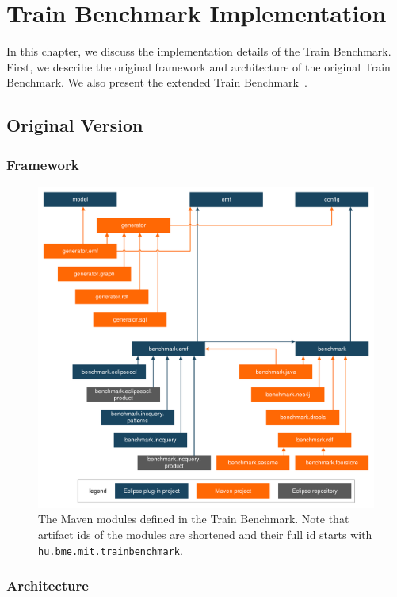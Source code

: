 \chapter{Train Benchmark Implementation}

In this chapter, we discuss the implementation details of the Train Benchmark. First, we describe the original framework and architecture of the original Train Benchmark. We also present the extended Train Benchmark~\cite{SCP2014}.

\section{Original Version}

\subsection{Framework}

\begin{figure}[!Htb]
	\centering
	\includegraphics[width=\textwidth]{figures/trainbenchmark-modules}
	\caption{The Maven modules defined in the Train Benchmark. Note that artifact ids of the modules are shortened and their full id starts with \texttt{hu.bme.mit.trainbenchmark}.}
	\label{fig:trainbenchmark-modules}
\end{figure}

\subsection{Architecture}

